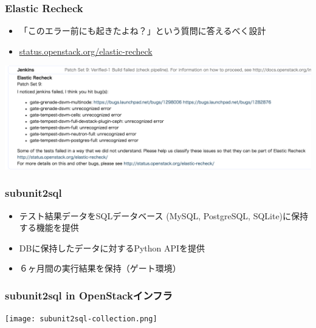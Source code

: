 \documentclass[aspectratio=169,11pt,hyperref={colorlinks=true}]{beamer}
\begin{document}
\begin{frame}
  \frametitle{Elastic Recheck}
  \begin{itemize}
    \item 「このエラー前にも起きたよね？」という質問に答えるべく設計
    \item \href{http://status.openstack.org/elastic-recheck/}{status.openstack.org/elastic-recheck}
  \end{itemize}
  \begin{center}
    \includegraphics[width=.9\textwidth]{elastic-recheck-sample.png}
  \end{center}
\end{frame}

\begin{frame}
  \frametitle{subunit2sql}
  \begin{itemize}
    \item テスト結果データをSQLデータベース (MySQL, PostgreSQL, SQLite)に保持する機能を提供
    \item DBに保持したデータに対するPython APIを提供
    \item ６ヶ月間の実行結果を保持（ゲート環境）
  \end{itemize}
\end{frame}

\begin{frame}
  \frametitle{subunit2sql in OpenStackインフラ}
  \begin{center}
    \texttt{[image: subunit2sql-collection.png]}
  \end{center}
\end{frame}
\end{document}

